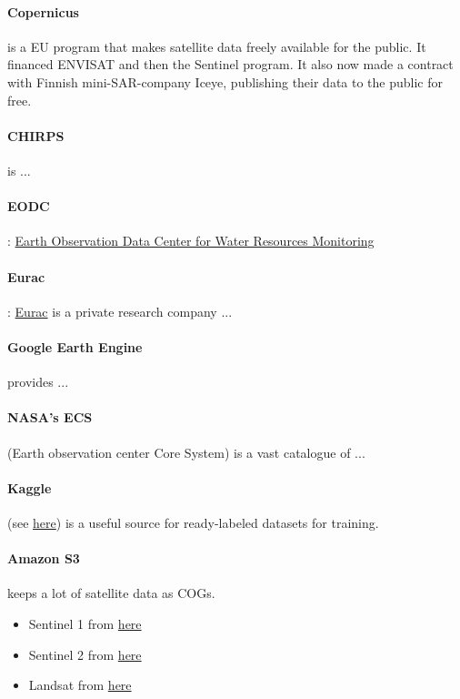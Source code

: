 \paragraph{Copernicus} is a EU program that makes satellite data freely available for the public. It financed ENVISAT and then the Sentinel program.
It also now made a contract with Finnish mini-SAR-company Iceye, publishing their data to the public for free.

\paragraph{CHIRPS} is ...

\paragraph{EODC}: \href{https://www.eodc.eu/}{Earth Observation Data Center for Water Resources Monitoring}

\paragraph{Eurac}: \href{http://www.eurac.edu}{Eurac} is a private research company ...

\paragraph{Google Earth Engine} provides ...

\paragraph{NASA's ECS} (Earth observation center Core System) is a vast catalogue of ...

\paragraph{Kaggle} (see \href{https://www.kaggle.com/search?q=sentinel}{here}) is a useful source for ready-labeled datasets for training.

\paragraph{Amazon S3} keeps a lot of satellite data as COGs. \begin{itemize}
    \item Sentinel 1 from \href{https://registry.opendata.aws/sentinel-1/}{here}
    \item Sentinel 2 from \href{https://sentinel-cogs.s3.us-west-2.amazonaws.com/sentinel-s2-l2a-cogs/2020/S2A_36QWD_20200701_0_L2A/TCI.tif}{here}
    \item Landsat from \href{https://landsat-pds.s3.amazonaws.com/c1/L8/139/045/LC08_L1TP_139045_20170304_20170316_01_T1/LC08_L1TP_139045_20170304_20170316_01_T1}{here}
\end{itemize}


